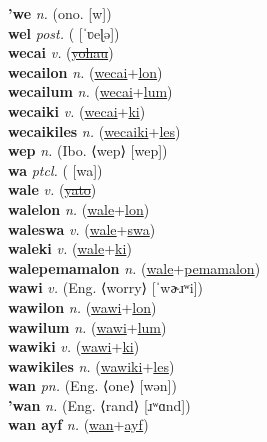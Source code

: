 \textbf{'we} \textit{n.} (ono. [w])
 \label{'we} \\
\textbf{wel} \textit{post.} ( [ˈʋeɭə])
 \label{wel} \\
\textbf{wecai} \textit{v.} (\hyperref[yohau]{\sout{yohau}})
 \label{wecai} \\
\textbf{wecailon} \textit{n.} (\hyperref[wecai]{wecai}+\hyperref[lon]{lon})
 \label{wecailon} \\
\textbf{wecailum} \textit{n.} (\hyperref[wecai]{wecai}+\hyperref[lum]{lum})
 \label{wecailum} \\
\textbf{wecaiki} \textit{v.} (\hyperref[wecai]{wecai}+\hyperref[ki]{ki})
 \label{wecaiki} \\
\textbf{wecaikiles} \textit{n.} (\hyperref[wecaiki]{wecaiki}+\hyperref[les]{les})
 \label{wecaikiles} \\
\textbf{wep} \textit{n.} (Ibo. ⟨wep⟩ [wep])
 \label{wep} \\
\textbf{wa} \textit{ptcl.} ( [wa])
 \label{wa} \\
\textbf{wale} \textit{v.} (\hyperref[yato]{\sout{yato}})
 \label{wale} \\
\textbf{walelon} \textit{n.} (\hyperref[wale]{wale}+\hyperref[lon]{lon})
 \label{walelon} \\
\textbf{waleswa} \textit{v.} (\hyperref[wale]{wale}+\hyperref[swa]{swa})
 \label{waleswa} \\
\textbf{waleki} \textit{v.} (\hyperref[wale]{wale}+\hyperref[ki]{ki})
 \label{waleki} \\
\textbf{walepemamalon} \textit{n.} (\hyperref[wale]{wale}+\hyperref[pemamalon]{pemamalon})
 \label{walepemamalon} \\
\textbf{wawi} \textit{v.} (Eng. ⟨worry⟩ [ˈwɚɹʷi])
 \label{wawi} \\
\textbf{wawilon} \textit{n.} (\hyperref[wawi]{wawi}+\hyperref[lon]{lon})
 \label{wawilon} \\
\textbf{wawilum} \textit{n.} (\hyperref[wawi]{wawi}+\hyperref[lum]{lum})
 \label{wawilum} \\
\textbf{wawiki} \textit{v.} (\hyperref[wawi]{wawi}+\hyperref[ki]{ki})
 \label{wawiki} \\
\textbf{wawikiles} \textit{n.} (\hyperref[wawiki]{wawiki}+\hyperref[les]{les})
 \label{wawikiles} \\
\textbf{wan} \textit{pn.} (Eng. ⟨one⟩ [wən])
 \label{wan} \\
\textbf{'wan} \textit{n.} (Eng. ⟨rand⟩ [ɹʷɑnd])
 \label{'wan} \\
\textbf{wan ayf} \textit{n.} (\hyperref[wan]{wan}+\hyperref[ayf]{ayf})
